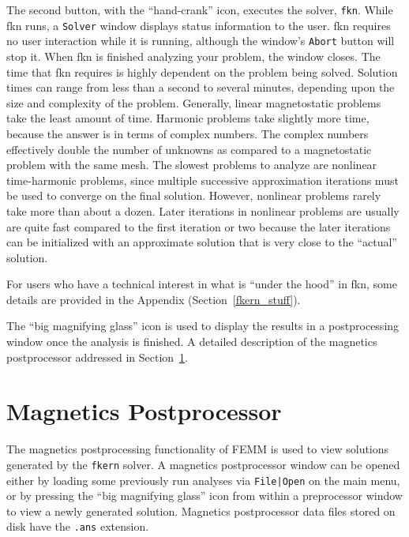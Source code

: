 \documentclass[12pt]{report}
\begin{document}
The second button, with the ``hand-crank'' icon, executes the
solver, {\tt fkn}. While fkn runs, a {\tt Solver} window displays
status information to the user. fkn requires no user
interaction while it is running, although the window's {\tt Abort}
button will stop it. When fkn is finished analyzing
your problem, the window closes. The time that
fkn requires is highly dependent on the problem being solved.
Solution times can range from less than a second to several minutes,
depending upon the size and complexity of the problem. Generally,
linear magnetostatic problems take the least amount of time.
Harmonic problems take slightly more time, because the answer is in
terms of complex numbers. The complex numbers effectively double
the number of unknowns as compared to a magnetostatic problem with
the same mesh. The slowest problems to analyze are nonlinear
time-harmonic problems, since multiple successive approximation
iterations must be used to converge on the final solution. However,
nonlinear problems rarely take more than about a dozen. Later
iterations in nonlinear problems are usually are quite fast
compared to the first iteration or two because the later iterations
can be initialized with an approximate solution that is very close
to the ``actual'' solution.

For users who have a technical interest in what is ``under the
hood'' in fkn, some details are provided in the Appendix
(Section~\ref{fkern_stuff}).

The ``big magnifying glass'' icon is used to display the results in
a postprocessing window once the analysis is finished.  A detailed
description of the magnetics postprocessor addressed in
Section~\ref{ppsec}.

\section{Magnetics Postprocessor} \label{ppsec}

The magnetics postprocessing functionality of FEMM is used to
view solutions generated by the {\tt fkern} solver.  A magnetics
postprocessor window can be opened either by loading some
previously run analyses via {\tt File|Open} on the main menu, or by
pressing the ``big magnifying glass'' icon from within a
preprocessor window to view a newly generated solution. Magnetics
postprocessor data files stored on disk have the {\tt .ans} extension.
\end{document}
